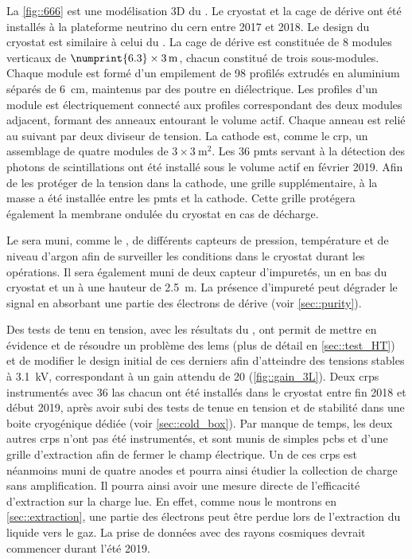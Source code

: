       La \autoref{fig::666} est une modélisation 3D du \SSS{}. Le cryostat et la cage de dérive ont été installés à la plateforme neutrino du \gls{cern} entre 2017 et 2018. Le design du cryostat est similaire à celui du \TOO{}. La cage de dérive est constituée de 8 modules verticaux de $\numprint{6.3}\times\SI{3}{\meter}$, chacun constitué de trois sous-modules. Chaque module est formé d'un empilement de 98 profilés extrudés en aluminium séparés de \SI{6}{\centi\meter}, maintenus par des poutre en diélectrique. Les profiles d'un module est électriquement connecté aux profiles correspondant des deux modules adjacent, formant des anneaux entourant le volume actif. Chaque anneau est relié au suivant par deux diviseur de tension. La cathode est, comme le \gls{crp}, un assemblage de quatre modules de $3\times\SI{3}{\meter\squared}$. Les 36 \glspl{pmt} servant à la détection des photons de scintillations ont été installé sous le volume actif en février 2019. Afin de les protéger de la tension dans la cathode, une grille supplémentaire, à la masse a été installée entre les \glspl{pmt} et la cathode. Cette grille protégera également la membrane ondulée du cryostat en cas de décharge. 

      Le \SSS{} sera muni, comme le \TOO{}, de différents capteurs de pression, température et de niveau d'argon afin de surveiller les conditions dans le cryostat durant les opérations. Il sera également muni de deux capteur d'impuretés, un en bas du cryostat et un à une hauteur de \SI{2.5}{\meter}. La présence d'impureté peut dégrader le signal en absorbant une partie des électrons de dérive (voir \autoref{sec::purity}).

      Des tests de tenu en tension, avec les résultats du \TOO{}, ont permit de mettre en évidence et de résoudre un problème des \glspl{lem} (plus de détail en \autoref{sec::test_HT}) et de modifier le design initial de ces derniers afin d'atteindre des tensions stables à \SI{3.1}{\kilo\volt}, correspondant à un gain attendu de 20 (\autoref{fig::gain_3L}). Deux \glspl{crp} instrumentés avec 36 \gls{las} chacun ont été installés dans le cryostat entre fin 2018 et début 2019, après avoir subi des tests de tenue en tension et de stabilité dans une boite cryogénique dédiée (voir \autoref{sec::cold_box}). Par manque de temps, les deux autres \glspl{crp} n'ont pas été instrumentés, et sont munis de simples \glspl{pcb} et d'une grille d'extraction afin de fermer le champ électrique. Un de ces \glspl{crp} est néanmoins muni de quatre anodes et pourra ainsi étudier la collection de charge sans amplification. Il pourra ainsi avoir une mesure directe de l'efficacité d'extraction sur la charge lue. En effet, comme nous le montrons en \autoref{sec::extraction}, une partie des électrons peut être perdue lors de l'extraction du liquide vers le gaz. La prise de données avec des rayons cosmiques devrait commencer durant l'été 2019. 

